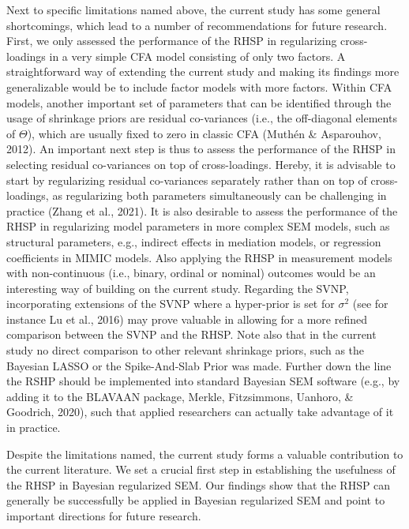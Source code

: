 \documentclass[
  man, donotrepeattitle,floatsintext]{apa6}
\begin{document}
Next to specific limitations named above, the current study has some general shortcomings, which lead to a number of recommendations for future research. First, we only assessed the performance of the RHSP in regularizing cross-loadings in a very simple CFA model consisting of only two factors. A straightforward way of extending the current study and making its findings more generalizable would be to include factor models with more factors. Within CFA models, another important set of parameters that can be identified through the usage of shrinkage priors are residual co-variances (i.e., the off-diagonal elements of \(\Theta\)), which are usually fixed to zero in classic CFA (Muthén \& Asparouhov, 2012). An important next step is thus to assess the performance of the RHSP in selecting residual co-variances on top of cross-loadings. Hereby, it is advisable to start by regularizing residual co-variances separately rather than on top of cross-loadings, as regularizing both parameters simultaneously can be challenging in practice (Zhang et al., 2021). It is also desirable to assess the performance of the RHSP in regularizing model parameters in more complex SEM models, such as structural parameters, e.g., indirect effects in mediation models, or regression coefficients in MIMIC models. Also applying the RHSP in measurement models with non-continuous (i.e., binary, ordinal or nominal) outcomes would be an interesting way of building on the current study. Regarding the SVNP, incorporating extensions of the SVNP where a hyper-prior is set for \(\sigma^2\) (see for instance Lu et al., 2016) may prove valuable in allowing for a more refined comparison between the SVNP and the RHSP. Note also that in the current study no direct comparison to other relevant shrinkage priors, such as the Bayesian LASSO or the Spike-And-Slab Prior was made. Further down the line the RSHP should be implemented into standard Bayesian SEM software (e.g., by adding it to the BLAVAAN package, Merkle, Fitzsimmons, Uanhoro, \& Goodrich, 2020), such that applied researchers can actually take advantage of it in practice.

Despite the limitations named, the current study forms a valuable contribution to the current literature. We set a crucial first step in establishing the usefulness of the RHSP in Bayesian regularized SEM. Our findings show that the RHSP can generally be successfully be applied in Bayesian regularized SEM and point to important directions for future research.

\clearpage
\end{document}
